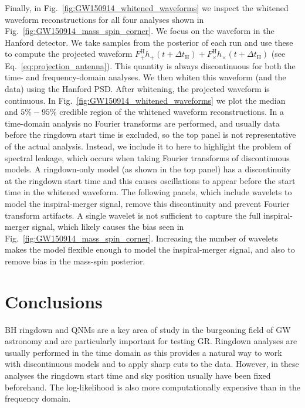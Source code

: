 Finally, in Fig.~\ref{fig:GW150914_whitened_waveforms} we inspect the whitened waveform reconstructions for all four analyses shown in Fig.~\ref{fig:GW150914_mass_spin_corner}.
We focus on the waveform in the Hanford detector.
We take samples from the posterior of each run and use these to compute the projected waveform $F^\mathrm{H}_{+} h_+(t+\Delta t_\mathrm{H})+F^\mathrm{H}_{\times} h_\times(t+\Delta t_\mathrm{H})$ (see Eq.~\ref{eq:projection_antenna}). This quantity is always discontinuous for both the time- and frequency-domain analyses.
We then whiten this waveform (and the data) using the Hanford PSD. After whitening, the projected waveform is continuous.
In Fig.~\ref{fig:GW150914_whitened_waveforms} we plot the median and $5\%-95\%$ credible region of the whitened waveform reconstructions.
In a time-domain analysis no Fourier transforms are performed, and usually data before the ringdown start time is excluded, so the top panel is not representative of the actual analysis.
Instead, we include it to here to highlight the problem of spectral leakage, which occurs when taking Fourier transforms of discontinuous models. 
A ringdown-only model (as shown in the top panel) has a discontinuity at the ringdown start time and this causes oscillations to appear before the start time in the whitened waveform.
The following panels, which include wavelets to model the inspiral-merger signal, remove this discontinuity and prevent Fourier transform artifacts.
A single wavelet is not sufficient to capture the full inspiral-merger signal, which likely causes the bias seen in Fig.~\ref{fig:GW150914_mass_spin_corner}. 
Increasing the number of wavelets makes the model flexible enough to model the inspiral-merger signal, and also to remove bias in the mass-spin posterior.



\section{Conclusions}\label{ch3:sec:discussion}

BH ringdown and QNMs are a key area of study in the burgeoning field of GW astronomy and are particularly important for testing GR.
Ringdown analyses are usually performed in the time domain as this provides a natural way to work with discontinuous models and to apply sharp cuts to the data. 
However, in these analyses the ringdown start time and sky position usually have been fixed beforehand.
The log-likelihood is also more computationally expensive than in the frequency domain.

